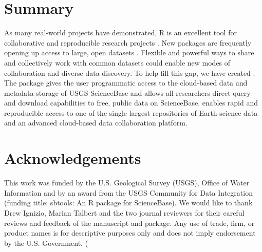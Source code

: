 \section{Summary}

As many real-world projects have demonstrated, R is
an excellent tool for collaborative and reproducible
research projects \citep{Gandrud2013}. New packages are
frequently opening up access to large, open datasets 
\citep{rNOMADS, rFDSN}. Flexible and powerful
ways to share and collectively work with common datasets
could enable new modes of collaboration and diverse data discovery.
To help fill this gap, we have created . 
The  package gives the user programmatic access to the
cloud-based data and metadata storage of USGS ScienceBase
and allows all researchers direct query and download
capabilities to free, public data on ScienceBase.
 enables rapid and reproducible
access to one of the single
largest repositories of Earth-science data and an advanced
cloud-based data collaboration platform.

\section{Acknowledgements}

This work was funded by the U.S. Geological Survey (USGS), Office of 
Water Information and by an award from the USGS Community for Data Integration
(funding title: sbtools: An R package for ScienceBase). 
We would like to thank Drew Ignizio, Marian Talbert and the two journal reviewers
for their careful reviews and feedback of the manuscript and package. Any use of trade, 
firm, or product names is for descriptive purposes only and does not imply endorsement 
by the U.S. Government.
(